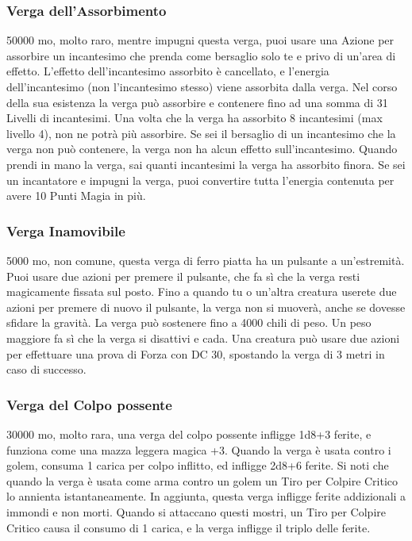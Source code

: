 \begin{multicols}{2}
	\subsubsection*{Verga dell'Assorbimento}
	50000 mo, molto raro, mentre impugni questa verga, puoi usare una Azione per assorbire un incantesimo che prenda come bersaglio solo te e privo di un'area di effetto. L'effetto dell'incantesimo assorbito è cancellato, e l'energia dell'incantesimo (non l'incantesimo stesso) viene assorbita dalla verga. Nel corso della sua esistenza la verga può assorbire e contenere fino ad una somma di 31 Livelli di incantesimi. Una volta che la verga ha assorbito 8 incantesimi (max livello 4), non ne potrà più assorbire. Se sei il bersaglio di un incantesimo che la verga non può contenere, la verga non ha alcun effetto sull'incantesimo. Quando prendi in mano la verga, sai quanti incantesimi la verga ha assorbito finora. Se sei un incantatore e impugni la verga, puoi convertire tutta l'energia contenuta per avere 10 Punti Magia in più.

	\subsubsection*{Verga Inamovibile}
	5000 mo, non comune, questa verga di ferro piatta ha un pulsante a un'estremità. Puoi usare due azioni per premere il pulsante, che fa sì che la verga resti magicamente fissata sul posto. Fino a quando tu o un'altra creatura userete due azioni per premere di nuovo il pulsante, la verga non si muoverà, anche se dovesse sfidare la gravità. La verga può sostenere fino a 4000 chili di peso. Un peso maggiore fa sì che la verga si disattivi e cada. Una creatura può usare due azioni per effettuare una prova di Forza con DC 30, spostando la verga di 3 metri in caso di successo.

	\subsubsection*{Verga del Colpo possente}
	30000 mo, molto rara, una verga del colpo possente infligge 1d8+3 ferite, e funziona come una mazza leggera magica +3. Quando la verga è usata contro i golem, consuma 1 carica per colpo inflitto, ed infligge 2d8+6 ferite. Si noti che quando la verga è usata come arma contro un golem un Tiro per Colpire Critico lo annienta istantaneamente. In aggiunta, questa verga infligge ferite addizionali a immondi e non morti. Quando si attaccano questi mostri, un Tiro per Colpire Critico causa il consumo di 1 carica, e la verga infligge il triplo delle ferite.


\end{multicols}
